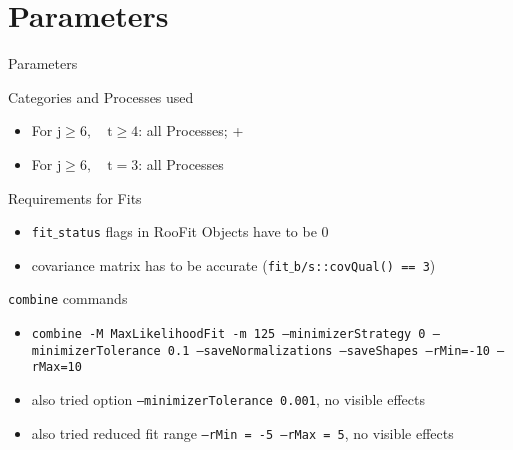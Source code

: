 \section{Parameters}
\begin{frame}{Parameters}
\begin{block}{Categories and Processes used}
\begin{itemize}
\item For $\text{j}\geq 6,\quad \text{t}\geq 4$: all Processes; \ttbarH \bbbar + \ttbar\bbbar\\
\item For $\text{j}\geq 6,\quad \text{t} = 3$: all Processes
\end{itemize}
\end{block}

\begin{block}{Requirements for Fits}
\begin{itemize}
\item \texttt{fit$\_$status} flags in RooFit Objects have to be 0\\
\item covariance matrix has to be accurate (\texttt{fit$\_$b/s::covQual() == 3})
\end{itemize}

\end{block}

\begin{block}{\texttt{combine} commands}
\begin{itemize}
\item \texttt{combine -M MaxLikelihoodFit -m 125 --minimizerStrategy 0 --minimizerTolerance 0.1 --saveNormalizations --saveShapes --rMin=-10 --rMax=10}
\item also tried option \texttt{--minimizerTolerance 0.001}, no visible effects
\item also tried reduced fit range \texttt{--rMin = -5 --rMax = 5}, no visible effects

\end{itemize}
\end{block}


\end{frame}

